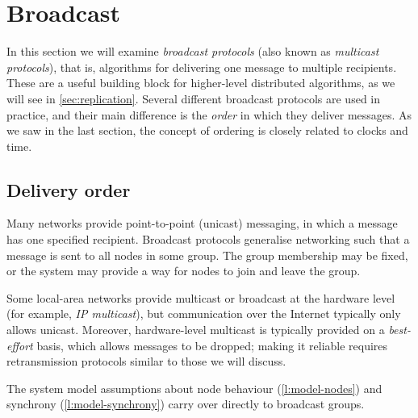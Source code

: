 \section{Broadcast}\label{sec:broadcast}

In this section we will examine \emph{broadcast protocols} (also known as \emph{multicast protocols}), that is, algorithms for delivering one message to multiple recipients.
These are a useful building block for higher-level distributed algorithms, as we will see in \autoref{sec:replication}.
Several different broadcast protocols are used in practice, and their main difference is the \emph{order} in which they deliver messages.
As we saw in the last section, the concept of ordering is closely related to clocks and time.

\subsection{Delivery order}\label{sec:delivery-order}

Many networks provide point-to-point (unicast) messaging, in which a message has one specified recipient.
Broadcast protocols generalise networking such that a message is sent to all nodes in some group.
The group membership may be fixed, or the system may provide a way for nodes to join and leave the group.

Some local-area networks provide multicast or broadcast at the hardware level (for example, \emph{IP multicast}), but communication over the Internet typically only allows unicast.
Moreover, hardware-level multicast is typically provided on a \emph{best-effort} basis, which allows messages to be dropped; making it reliable requires retransmission protocols similar to those we will discuss.

The system model assumptions about node behaviour (\autoref{l:model-nodes}) and synchrony (\autoref{l:model-synchrony}) carry over directly to broadcast groups.

